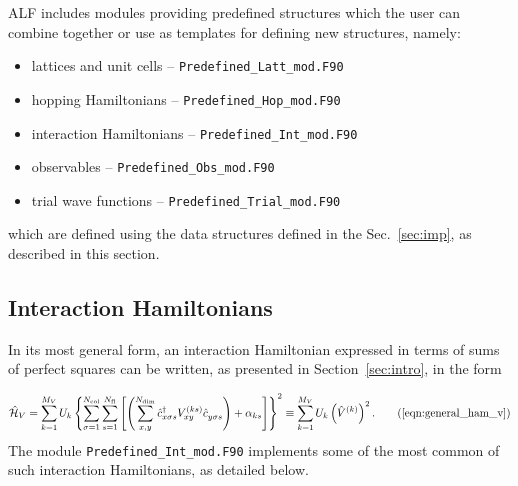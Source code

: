 





ALF includes modules providing predefined structures which the user can combine together or use as templates for defining new structures, namely: 
\begin{itemize}
	\item lattices and unit cells -- \texttt{Predefined\_Latt\_mod.F90}
	\item hopping Hamiltonians -- \texttt{Predefined\_Hop\_mod.F90 }
	\item interaction Hamiltonians -- \texttt{Predefined\_Int\_mod.F90}
	\item observables -- \texttt{Predefined\_Obs\_mod.F90 }
	\item trial wave functions -- \texttt{Predefined\_Trial\_mod.F90 }
\end{itemize}
which are defined using the data structures defined in the Sec.~\ref{sec:imp}, as described in this section.






\subsection{Interaction Hamiltonians}

In its most general form, an interaction Hamiltonian expressed in terms of sums of perfect squares can be written, as presented in Section~\ref{sec:intro}, in the form %

\begin{align*}
\hat{\mathcal{H}}_{V} =  \sum\limits_{k=1}^{M_V}U_{k}
\left\{ \sum\limits_{\sigma=1}^{N_{\mathrm{col}}}
\sum\limits_{s=1}^{N_{\mathrm{fl}}} \left[ \left(
\sum\limits_{x,y}^{N_{\mathrm{dim}}} \hat{c}^{\dagger}_{x \sigma s}V_{xy}^{(k s)}\hat{c}^{\phantom\dagger}_{y \sigma s}\right)  +\alpha_{k s}  \right] \right\}^{2}
\equiv    \sum\limits_{k=1}^{M_V}U_{k}   \left(\hat{V}^{(k)} \right)^2.
\tag{\ref{eqn:general_ham_v}}
\end{align*}
The module \texttt{Predefined\_Int\_mod.F90} implements some of the most common of such interaction Hamiltonians, as detailed below.


